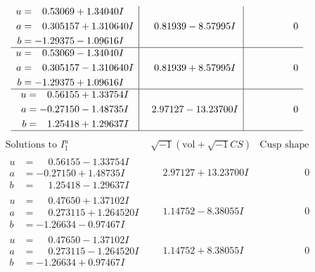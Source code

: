 \documentclass[1p]{elsarticle_modified}
\theoremstyle{definition}
\newcommand{\I}{\sqrt{-1}}
\begin{document}
$$\begin{array}{c|c|c}
\begin{aligned}
u &= \phantom{-}0.53069 + 1.34040 I \\
a &= \phantom{-}0.305157 + 1.310640 I \\
b &= -1.29375 - 1.09616 I\end{aligned}
 & \phantom{-}0.81939 - 8.57995 I & \phantom{-0.000000 } 0 \\ \hline\begin{aligned}
u &= \phantom{-}0.53069 - 1.34040 I \\
a &= \phantom{-}0.305157 - 1.310640 I \\
b &= -1.29375 + 1.09616 I\end{aligned}
 & \phantom{-}0.81939 + 8.57995 I & \phantom{-0.000000 } 0 \\ \hline\begin{aligned}
u &= \phantom{-}0.56155 + 1.33754 I \\
a &= -0.27150 - 1.48735 I \\
b &= \phantom{-}1.25418 + 1.29637 I\end{aligned}
 & \phantom{-}2.97127 - 13.23700 I & \phantom{-0.000000 } 0\\
 \hline 
 \end{array}$$\newpage$$\begin{array}{c|c|c}  
\text{Solutions to }I^u_{1}& \I (\text{vol} + \sqrt{-1}CS) & \text{Cusp shape}\\
 \hline 
\begin{aligned}
u &= \phantom{-}0.56155 - 1.33754 I \\
a &= -0.27150 + 1.48735 I \\
b &= \phantom{-}1.25418 - 1.29637 I\end{aligned}
 & \phantom{-}2.97127 + 13.23700 I & \phantom{-0.000000 } 0 \\ \hline\begin{aligned}
u &= \phantom{-}0.47650 + 1.37102 I \\
a &= \phantom{-}0.273115 + 1.264520 I \\
b &= -1.26634 - 0.97467 I\end{aligned}
 & \phantom{-}1.14752 - 8.38055 I & \phantom{-0.000000 } 0 \\ \hline\begin{aligned}
u &= \phantom{-}0.47650 - 1.37102 I \\
a &= \phantom{-}0.273115 - 1.264520 I \\
b &= -1.26634 + 0.97467 I\end{aligned}
 & \phantom{-}1.14752 + 8.38055 I & \phantom{-0.000000 } 0 \\ \hline\begin{aligned}

\end{aligned}
\end{array}$$
\end{document}
